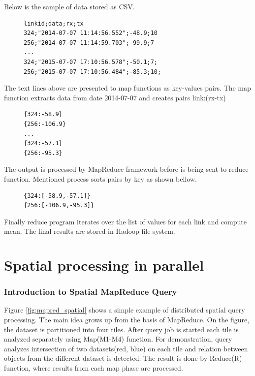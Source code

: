 \documentclass[a4paper,12pt,oneside]{report}
\begin{document}
Below is the sample of data stored as CSV.
\begin{figure}[!htbp]\lstset{extendedchars=false,escapeinside=''}\begin{lstlisting}[style=mybash]
linkid;data;rx;tx
324;"2014-07-07 11:14:56.552";-48.9;10
256;"2014-07-07 11:14:59.703";-99.9;7
...
324;"2015-07-07 17:10:56.578";-50.1;7;
256;"2015-07-07 17:10:56.484";-85.3;10;
\end{lstlisting} \end{figure}

The text lines above are presented to map functions as key-values pairs.
The map function extracts data from date 2014-07-07 and creates pairs {link:(rx-tx)}
\begin{figure}[!htbp]\lstset{extendedchars=false,escapeinside=''}\begin{lstlisting}[style=mybash]
{324:-58.9}
{256:-106.9}
...
{324:-57.1}
{256:-95.3}
\end{lstlisting} \end{figure}

The output is processed by MapReduce framework before is being sent to reduce function.
Mentioned process sorts pairs by key as shown bellow.
\begin{figure}[!htbp]\lstset{extendedchars=false,escapeinside=''}\begin{lstlisting}[style=mybash]
{324:[-58.9,-57.1]}
{256:[-106.9,-95.3]}
\end{lstlisting} \end{figure}

Finally reduce program iterates over the list of values for each link and compute mean.
 The final results are stored in Hadoop file system.
 


\section{Spatial processing in parallel}
	\subsubsection{Introduction to Spatial MapReduce Query}
Figure \ref{fig:mapred_spatial} shows a simple example of distributed spatial query processing. The main idea 
grows up from the basis of MapReduce. On the figure, the dataset is partitioned into four tiles. After 
query job is started each tile is analyzed separately using Map(M1-M4) function. For demonstration, 
query analyzes intersection of two datasets(red, blue) on each tile and relation between 
objects from the different dataset is detected. The result is done by Reduce(R) function, where results from each
map phase are processed.
\end{document}
